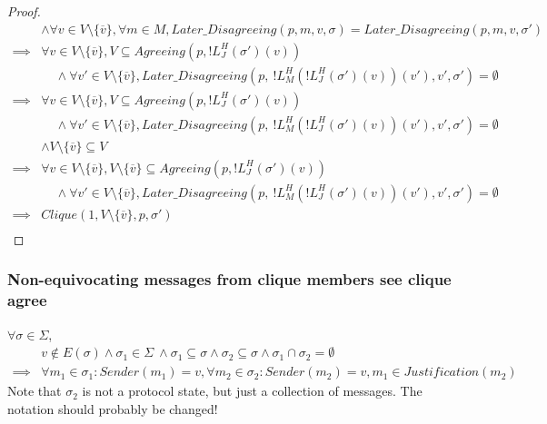 \begin{proof}
\begin{align}
        &\land \forall v \in V \setminus \{\overline{v}\}, \forall m \in M, Later\_Disagreeing(p, m, v, \sigma) = Later\_Disagreeing(p, m, v, \sigma') \\
\implies& \forall v \in V \setminus \{\overline{v}\}, V \subseteq Agreeing(p, !L^H_J(\sigma')(v)) \\
        &~~~~~ \land \forall v' \in V \setminus \{\overline{v}\},Later\_Disagreeing(p,~!L^H_M(!L^H_J(\sigma')(v))(v'), v', \sigma') = \emptyset \\
\implies& \forall v \in V \setminus \{\overline{v}\}, V \subseteq Agreeing(p, !L^H_J(\sigma')(v)) \\
        &~~~~~ \land \forall v' \in V \setminus \{\overline{v}\},Later\_Disagreeing(p,~!L^H_M(!L^H_J(\sigma')(v))(v'), v', \sigma') = \emptyset \\
        &\land V \setminus \{\overline{v}\} \subseteq V \\
\implies& \forall v \in V \setminus \{\overline{v}\}, V \setminus \{\overline{v}\} \subseteq Agreeing(p, !L^H_J(\sigma')(v)) \\
        &~~~~~ \land \forall v' \in V \setminus \{\overline{v}\},Later\_Disagreeing(p,~!L^H_M(!L^H_J(\sigma')(v))(v'), v', \sigma') = \emptyset \\
\implies& Clique(1, V \setminus \{\overline{v}\}, p, \sigma') \\
\end{align}
\end{proof}


\subsubsection{Non-equivocating messages from clique members see clique agree}
\begin{lemma}
$\forall \sigma \in \Sigma$,
\begin{align}
        &v \notin E(\sigma) \land \sigma_1 \in \Sigma ~\land \sigma_1 \subseteq \sigma \land \sigma_2 \subseteq \sigma \land \sigma_1 \cap \sigma_2 = \emptyset \\
\implies& \forall m_1 \in \sigma_1 : Sender(m_1) = v, \forall m_2 \in \sigma_2 : Sender(m_2) = v, m_1 \in Justification(m_2)
\end{align}
Note that $\sigma_2$ is not a protocol state, but just a collection of messages. The notation should probably be changed!
\end{lemma}



